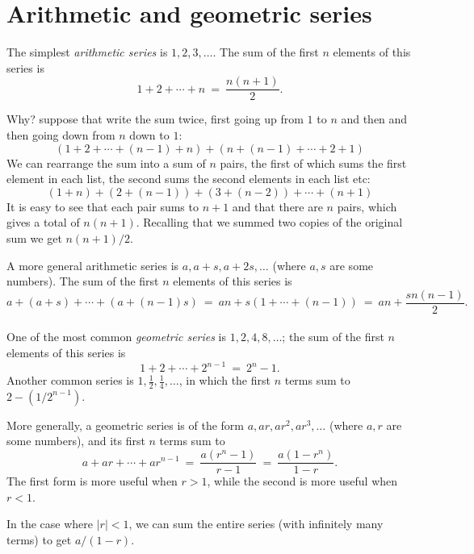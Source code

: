 \section{Arithmetic and geometric series}

The simplest {\it arithmetic series} is $1,2,3,\ldots$. The sum of the first 
$n$ elements of this series is
$$ 1 + 2 + \cdots + n \ = \ \frac{n(n+1)}{2} .$$

Why? suppose that write the sum twice, first going up from $1$ to $n$
and then and then going down from $n$ down to $1$:
$$ \left(1 + 2 + \cdots + (n-1) + n\right) + 
\left(n + (n-1) + \cdots + 2 + 1\right) $$
We can rearrange the sum into a sum of $n$ pairs, the first of which
sums the first element in each list, the second sums the second
elements in each list etc:
$$ (1+n) + (2+(n-1)) + (3+(n-2)) + \cdots + (n+1) $$
It is easy to see that each pair sums to $n+1$ and that there are $n$
pairs, which gives a total of $n(n+1)$. Recalling that we summed two
copies of the original sum we get $n(n+1)/2$.

A more general arithmetic series is $a, a+s, a+2s, \ldots$
(where $a,s$ are some numbers). The sum of the first $n$ elements of this series is
$$ a + (a+s) + \cdots + (a + (n-1)s)
\ = \ 
an + s(1 + \cdots + (n-1))
\ = \ 
an + \frac{sn(n-1)}{2}.
$$
\\

One of the most common {\it geometric series} is $1, 2, 4, 8, \ldots$; the sum
of the first $n$ elements of this series is
$$ 1 + 2 + \cdots + 2^{n-1} \ = \ 2^n - 1 .$$
Another common series is $1, \frac{1}{2}, \frac{1}{4}, \ldots$,
in which the first $n$ terms sum to $2 - (1/2^{n-1})$.

More generally, a geometric series is of the form $a, ar, ar^2, ar^3, \ldots$
(where $a,r$ are some numbers), and its first $n$ terms sum to
$$ a + ar + \cdots + ar^{n-1} 
\ = \ 
\frac{a(r^n-1)}{r-1}
\ = \ 
\frac{a(1-r^n)}{1-r}.$$
The first form is more useful when $r > 1$, while the second is more useful when $r< 1$.

In the case where $|r| < 1$, we can sum the entire series (with infinitely many terms) 
to get $a/(1-r)$.



